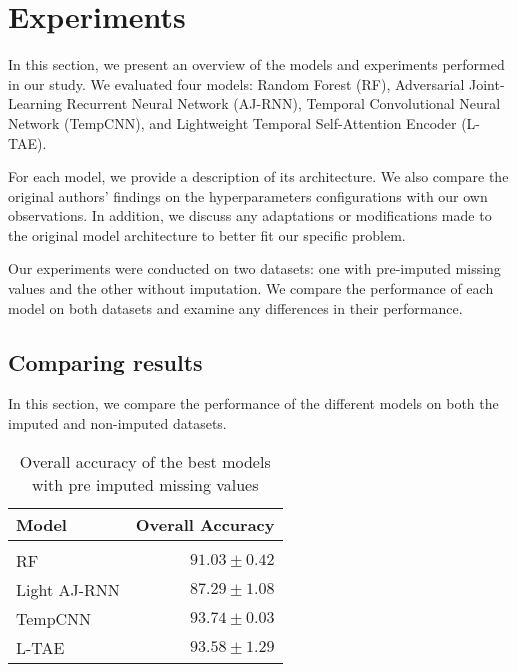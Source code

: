 \chapter{Experiments}
In this section, we present an overview of the models and experiments performed in our study. We evaluated four models: Random Forest (RF), Adversarial Joint-Learning Recurrent Neural Network (AJ-RNN), Temporal Convolutional Neural Network (TempCNN), and Lightweight Temporal Self-Attention Encoder (L-TAE).

For each model, we provide a description of its architecture.
We also compare the original authors' findings on the hyperparameters configurations with our own observations.
In addition, we discuss any adaptations or modifications made to the original model architecture to better fit our specific problem.

Our experiments were conducted on two datasets: one with pre-imputed missing values and the other without imputation. 
We compare the performance of each model on both datasets and examine any differences in their performance.


\pagebreak

\pagebreak

\pagebreak

\pagebreak

\section{Comparing results}

In this section, we compare the performance of the different models on both the imputed and non-imputed datasets.

\begin{table}[H]
  \centering
    \begin{tabular}{lr}
    Model                       & Overall Accuracy             \\[0.2cm] 
    \hline \\[-0.2cm]
    RF            & $91.03 \pm 0.42$\\
    Light AJ-RNN  & $87.29 \pm 1.08$\\
    TempCNN       & $93.74 \pm 0.03$\\
    L-TAE         & $93.58 \pm 1.29$
    \end{tabular}
  \caption{Overall accuracy of the best models with pre imputed missing values}
  \label{tab:ALLresultsImputed} 
\end{table}

